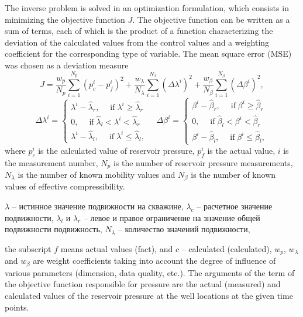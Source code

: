 \documentclass{article}
\begin{document}
The inverse problem is solved in an optimization
formulation, which consists in minimizing the objective function $J$.
The objective function can be written as a sum of terms, each of which
is the product of a function characterizing the deviation of the
calculated values from the control values and a weighting
coefficient for the corresponding type of variable. The mean square
error (MSE) was chosen as a deviation measure
\begin{equation} \label{mse}
	J=\frac{w_p}{N_p}\sum_{i=1}^{N_p}{\left(p_c^i-p_f^i\right)^2}+
	\frac{w_{\lambda}}{N_\lambda}\sum_{i=1}^{N_\lambda}{\left(\Delta\lambda^i  \right)^2}+
	\frac{w_{\beta}}{N_\beta}\sum_{i=1}^{N_\beta}{\left(\Delta\beta^i  \right)^2},
\end{equation}
\begin{equation}
		\Delta\lambda^i  = \left\{\begin{array}{crl}
		\lambda^i - \hat{\lambda}_r, \quad \;\mbox{if}\; \lambda^i \ge \hat{\lambda}_r\\
		0,\quad \;\mbox{if}\; \hat{\lambda}_l < \lambda^i < \hat{\lambda}_r\\
		\lambda^i - \hat{\lambda}_l, \quad \;\mbox{if}\;\lambda^i \le \hat{\lambda}_l,
	\end{array}\right.
		\quad
		\Delta\beta^i  = \left\{\begin{array}{crl}
		\beta^i - \hat{\beta}_r, \quad \;\mbox{if}\; \beta^i \ge \hat{\beta}_r\\
		0,\quad \;\mbox{if}\; \hat{\beta}_l < \beta^i < \hat{\beta}_r\\
		\beta^i - \hat{\beta}_l, \quad \;\mbox{if}\;\beta^i \le \hat{\beta}_l,
	\end{array}\right.
\end{equation}	
where $p_c^i$ is the calculated value of reservoir pressure, $p_f^i$
is the actual value, $i$ is the measurement number, $N_p$ is the
number of reservoir pressure measurements,$N_\lambda$ is the
number of known mobility values and $N_\beta$ is the number of known values of effective compressibility.

$\lambda$ – истинное значение подвижности на скважине, $\lambda_c$ – расчетное значение подвижности,  $\lambda_l$ и $\lambda_r$ – левое и правое ограничение на значение общей подвижности подвижность,  $N_\lambda$ – количество значений подвижности,

the subscript $f$ means actual values (fact), and $c$ -- calculated (calculated), 
$w_p$,  $w_\lambda$ and $w_\beta$ are weight coefficients taking into
account the degree of influence of various parameters (dimension,
data quality, etc.). The arguments of the term of the objective
function responsible for pressure are the actual (measured) and
calculated values of the reservoir pressure at the well locations at
the given time points. 
\end{document}
